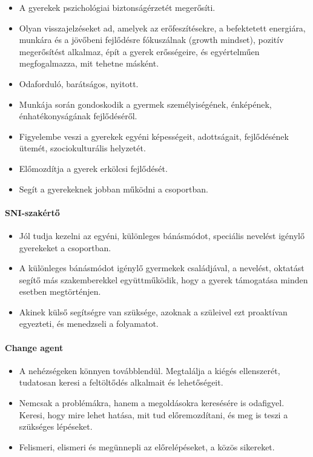 \begin{itemize}
\tightlist
\item
  A gyerekek pszichológiai biztonságérzetét megerősíti.
\item
  Olyan visszajelzéseket ad, amelyek az erőfeszítésekre, a befektetett
  energiára, munkára és a jövőbeni fejlődésre fókuszálnak (growth
  mindset), pozitív megerősítést alkalmaz, épít a gyerek erősségeire, és
  egyértelműen megfogalmazza, mit tehetne másként.
\item
  Odaforduló, barátságos, nyitott.
\item
  Munkája során gondoskodik a gyermek személyiségének, énképének,
  énhatékonyságának fejlődéséről.
\item
  Figyelembe veszi a gyerekek egyéni képességeit, adottságait,
  fejlődésének ütemét, szociokulturális helyzetét.
\item
  Előmozdítja a gyerek erkölcsi fejlődését.
\item
  Segít a gyerekeknek jobban működni a csoportban.
\end{itemize}

\hypertarget{sni-szakerto}{%
\paragraph{SNI-szakértő}\label{sni-szakerto}}

\begin{itemize}
\tightlist
\item
  Jól tudja kezelni az egyéni, különleges bánásmódot, speciális nevelést
  igénylő gyerekeket a csoportban.
\item
  A különleges bánásmódot igénylő gyermekek családjával, a nevelést,
  oktatást segítő más szakemberekkel együttműködik, hogy a\break
  gyerek
  támogatása minden esetben megtörténjen.
\item
  Akinek külső segítségre van szüksége, azoknak a szüleivel ezt
  proaktívan egyezteti, és menedzseli a folyamatot.
\end{itemize}

\hypertarget{change-agent}{%
\paragraph{Change agent}\label{change-agent}}

\begin{itemize}
\tightlist
\item
  A nehézségeken könnyen továbblendül. Megtalálja a kiégés ellenszerét,
  tudatosan keresi a feltöltődés alkalmait és lehetőségeit.
\item
  Nemcsak a problémákra, hanem a megoldásokra keresésére is odafigyel.
  Keresi, hogy mire lehet hatása, mit tud előremozdítani, és meg is
  teszi a szükséges lépéseket.
\item
  Felismeri, elismeri és megünnepli az előrelépéseket, a közös
  sikereket.
\end{itemize}
